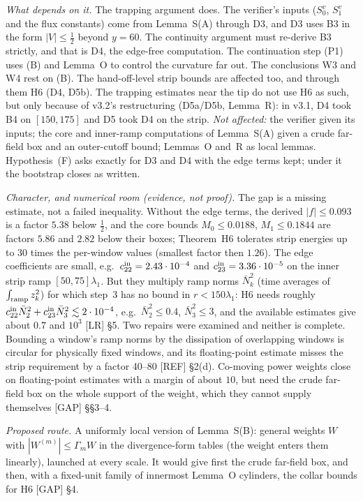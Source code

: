 \documentclass[11pt]{amsart}
\theoremstyle{definition}
\theoremstyle{remark}
\newcommand{\dref}[1]{[\textsf{#1}]}
\begin{document}
\emph{What depends on it.} The trapping argument does. The verifier's inputs ($S_0^v$, $S_1^v$ and the flux constants) come from Lemma~S(A) through D3, and D3 uses B3 in the form $|V|\le\frac12$ beyond $y=60$. The continuity argument must re-derive B3 strictly, and that is D4, the edge-free computation. The continuation step (P1) uses (B) and Lemma~O to control the curvature far out. The conclusions W3 and W4 rest on (B). The hand-off-level strip bounds are affected too, and through them H6 (D4, D5b). The trapping estimates near the tip do not use H6 as such, but only because of v3.2's restructuring (D5a/D5b, Lemma~R): in v3.1, D4 took B4 on $[150,175]$ and D5 took D4 on the strip. \emph{Not affected:} the verifier given its inputs; the core and inner-ramp computations of Lemma~S(A) given a crude far-field box and an outer-cutoff bound; Lemmas~O and~R as local lemmas. Hypothesis~(F) asks exactly for D3 and D4 with the edge terms kept; under it the bootstrap closes as written.

\emph{Character, and numerical room (evidence, not proof).} The gap is a missing estimate, not a failed inequality. Without the edge terms, the derived $|f|\le0.093$ is a factor $5.38$ below $\frac12$, and the core bounds $M_0\le0.0188$, $M_1\le0.1844$ are factors $5.86$ and $2.82$ below their boxes; Theorem~H6 tolerates strip energies up to $30$ times the per-window values (smallest factor then $1.26$). The edge coefficients are small, e.g.\ $c^{\rm in}_{22}=2.43\cdot10^{-4}$ and $c^{\rm in}_{23}=3.36\cdot10^{-5}$ on the inner strip ramp $[50,75]\lambda_1$. But they multiply ramp norms $\bar N_k^2$ (time averages of $\int_{\rm ramp}z_k^2$) for which step~3 has no bound in $r<150\lambda_1$: H6 needs roughly $c^{\rm in}_{22}\bar N_2^2+c^{\rm in}_{23}\bar N_3^2\lesssim2\cdot10^{-4}$, e.g.\ $\bar N_2^2\le0.4$, $\bar N_3^2\le3$, and the available estimates give about $0.7$ and $10^3$ \dref{LR} \S5. Two repairs were examined and neither is complete. Bounding a window's ramp norms by the dissipation of overlapping windows is circular for physically fixed windows, and its floating-point estimate misses the strip requirement by a factor 40--80 \dref{REF} \S2(d). Co-moving power weights close on floating-point estimates with a margin of about $10$, but need the crude far-field box on the whole support of the weight, which they cannot supply themselves \dref{GAP} \S\S3--4.

\emph{Proposed route.} A uniformly local version of Lemma~S(B): general weights $W$ with $|W^{(m)}|\le\Gamma_mW$ in the divergence-form tables (the weight enters them linearly), launched at every scale. It would give first the crude far-field box, and then, with a fixed-unit family of innermost Lemma~O cylinders, the collar bounds for H6 \dref{GAP} \S4.
\end{document}
